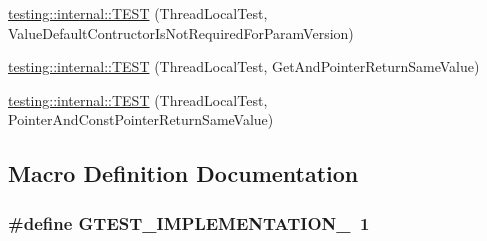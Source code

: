 \begin{DoxyCompactItemize}
\item 
\hyperlink{namespacetesting_1_1internal_a6dffc8331590224259b60e855ad07d03}{testing\+::internal\+::\+T\+E\+ST} (Thread\+Local\+Test, Value\+Default\+Contructor\+Is\+Not\+Required\+For\+Param\+Version)
\item 
\hyperlink{namespacetesting_1_1internal_a0e7c2d58a313bec0821df19f44351d84}{testing\+::internal\+::\+T\+E\+ST} (Thread\+Local\+Test, Get\+And\+Pointer\+Return\+Same\+Value)
\item 
\hyperlink{namespacetesting_1_1internal_aaed45d6ba960f02e8d3d042c606bc98e}{testing\+::internal\+::\+T\+E\+ST} (Thread\+Local\+Test, Pointer\+And\+Const\+Pointer\+Return\+Same\+Value)
\end{DoxyCompactItemize}


\subsection{Macro Definition Documentation}
\subsubsection[{\texorpdfstring{G\+T\+E\+S\+T\+\_\+\+I\+M\+P\+L\+E\+M\+E\+N\+T\+A\+T\+I\+O\+N\+\_\+}{GTEST_IMPLEMENTATION_}}]{\setlength{\rightskip}{0pt plus 5cm}\#define G\+T\+E\+S\+T\+\_\+\+I\+M\+P\+L\+E\+M\+E\+N\+T\+A\+T\+I\+O\+N\+\_\+~1}\hypertarget{gtest-port__test_8cc_a83bd232fd1077579fada92c31bb7469f}{}\label{gtest-port__test_8cc_a83bd232fd1077579fada92c31bb7469f}
